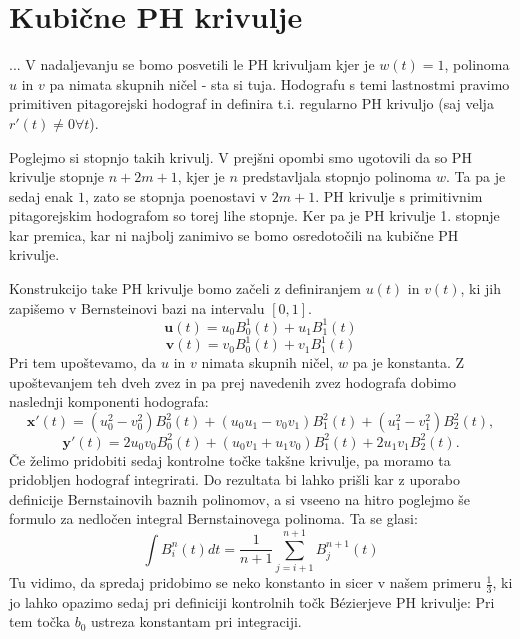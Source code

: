 \documentclass[12pt]{article}
\begin{document}
\section*{Kubične PH krivulje}
...
V nadaljevanju se bomo posvetili le PH krivuljam kjer je $w(t)=1$, polinoma $u$ in $v$ pa nimata skupnih ničel - sta si tuja.
Hodografu s temi lastnostmi pravimo primitiven pitagorejski hodograf in definira t.i. regularno PH krivuljo (saj velja $r'(t) \neq 0 \forall t$).

Poglejmo si stopnjo takih krivulj. V prejšni opombi smo ugotovili da so PH krivulje stopnje $n+2m+1$, kjer je $n$ predstavljala stopnjo polinoma $w$.
Ta pa je sedaj enak $1$, zato se stopnja poenostavi v $2m + 1$. PH krivulje s primitivnim pitagorejskim hodografom so torej lihe stopnje. 
Ker pa je PH krivulje 1. stopnje kar premica, kar ni najbolj zanimivo se bomo osredotočili na kubične PH krivulje.

Konstrukcijo take PH krivulje bomo začeli z definiranjem $u(t)$ in $v(t)$, ki jih zapišemo v Bernsteinovi bazi na intervalu $[0,1]$.
$$ \textbf{u}(t) = u_0 B_0^1(t) + u_1 B_1^1(t) $$
$$ \textbf{v}(t) = v_0 B_0^1(t) + v_1 B_1^1(t) $$
Pri tem upoštevamo, da $u$ in $v$ nimata skupnih ničel, $w$ pa je konstanta.
Z upoštevanjem teh dveh zvez in pa prej navedenih zvez hodografa dobimo naslednji komponenti hodografa:
$$\textbf{x}'(t) = (u_0^2 - v_0^2)B_0^2(t) + (u_0 u_1 - v_0 v_1) B_1^2(t) + (u_1^2 - v_1^2) B_2^2(t),$$
$$\textbf{y}'(t) = 2 u_0 v_0 B_0^2(t) + (u_0 v_1 + u_1 v_0) B_1^2(t) + 2 u_1 v_1 B_2^2(t).$$
Če želimo pridobiti sedaj kontrolne točke takšne krivulje, pa moramo ta pridobljen hodograf integrirati.
Do rezultata bi lahko prišli kar z uporabo definicije Bernstainovih baznih polinomov, a si vseeno na hitro poglejmo še formulo za nedločen integral Bernstainovega polinoma.
Ta se glasi:
$$\int B^n_i(t) dt = \frac{1}{n+1} \sum_{j=i+1}^{n+1} B^{n+1}_j(t)$$
Tu vidimo, da spredaj pridobimo se neko konstanto in sicer v našem primeru $\frac{1}{3}$, ki jo lahko opazimo sedaj pri definiciji kontrolnih točk B\'ezierjeve PH krivulje:
Pri tem točka $b_0$ ustreza konstantam pri integraciji. 
\end{document}
